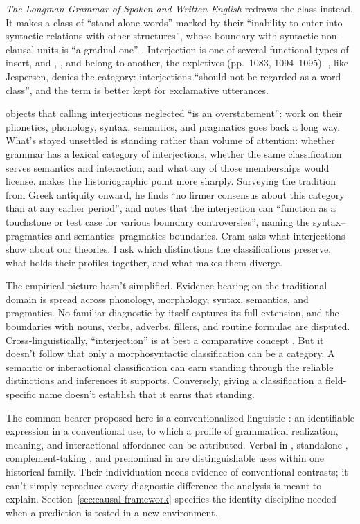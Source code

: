 \documentclass[12pt]{article}
\begin{document}
\textit{The Longman Grammar of Spoken and Written English} redraws the class instead. It makes  a class of \enquote{stand-alone words} marked by their \enquote{inability to enter into syntactic relations with other structures}, whose boundary with syntactic non-clausal units is \enquote{a gradual one} \citep[1082]{Biber1999}. Interjection is one of several functional types of insert, and , , and  belong to another, the expletives (pp.~1083, 1094--1095). \textcite[81, 83]{ljung2011}, like Jespersen, denies the category: interjections \enquote{should not be regarded as a word class}, and the term is better kept for exclamative utterances.

\textcite{libert2019} objects that calling interjections neglected \enquote{is an overstatement}: work on their phonetics, phonology, syntax, semantics, and pragmatics goes back a long way. What's stayed unsettled is standing rather than volume of attention: whether grammar has a lexical category of interjections, whether the same classification serves semantics and interaction, and what any of those memberships would license. \textcite[63]{cram2008} makes the historiographic point more sharply. Surveying the tradition from Greek antiquity onward, he finds \enquote{no firmer consensus about this category than at any earlier period}, and notes that the interjection can \enquote{function as a touchstone or test case for various boundary controversies}, naming the syntax--pragmatics and semantics--pragmatics boundaries. Cram asks what interjections show about our theories. I ask which distinctions the classifications preserve, what holds their profiles together, and what makes them diverge.

The empirical picture hasn't simplified. Evidence bearing on the traditional domain is spread across phonology, morphology, syntax, semantics, and pragmatics. No familiar diagnostic by itself captures its full extension, and the boundaries with nouns, verbs, adverbs, fillers, and routine formulae are disputed. Cross-linguistically, \enquote{interjection} is at best a comparative concept \citep{haspelmath2010}. But it doesn't follow that only a morphosyntactic classification can be a category. A semantic or interactional classification can earn standing through the reliable distinctions and inferences it supports. Conversely, giving a classification a field-specific name doesn't establish that it earns that standing.

The common bearer proposed here is a conventionalized linguistic : an identifiable expression in a conventional use, to which a profile of grammatical realization, meaning, and interactional affordance can be attributed. Verbal  in , standalone , complement-taking , and prenominal  in  are distinguishable uses within one historical family. Their individuation needs evidence of conventional contrasts; it can't simply reproduce every diagnostic difference the analysis is meant to explain. Section~\ref{sec:causal-framework} specifies the identity discipline needed when a prediction is tested in a new environment.
\end{document}
